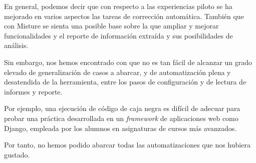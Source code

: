 En general, podemos decir que con respecto a las experiencias piloto se ha mejorado en varios aspectos las tareas de corrección automática. También que con Misture se sienta una posible base sobre la que ampliar y mejorar funcionalidades y el reporte de información extraída y sus posibilidades de análisis.

Sin embargo, nos hemos encontrado con que no es tan fácil de alcanzar un grado elevado de generalización de casos a abarcar, y de automatización plena y desatendida de la herramienta, entre los pasos de configuración y de lectura de informes y reporte.

Por ejemplo, una ejecución de código de caja negra es difícil de adecuar para probar una práctica desarrollada en un \textit{framework} de aplicaciones web como Django, empleada por los alumnos en asignaturas de cursos más avanzados.

Por tanto, no hemos podido abarcar todas las automatizaciones que nos hubiera gustado.


